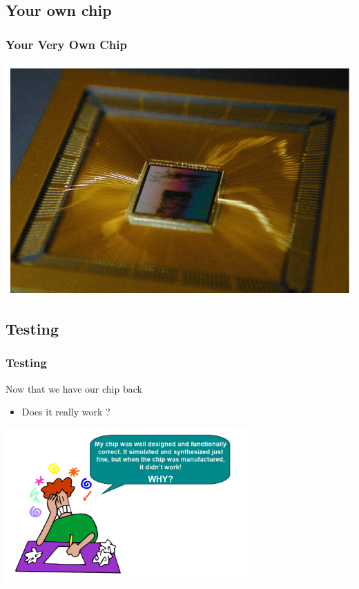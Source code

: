 \documentclass[compress]{beamer}
\begin{document}
\subsection[Chip]{Your own chip}
\begin{frame}
	\frametitle{Your Very Own Chip}
	\begin{center}
		\includegraphics[width=\textwidth]{chip_1}
	\end{center}
\end{frame}
\subsection[Testing]{Testing}
\begin{frame}
\frametitle{Testing}
\begin{block}{Now that we have our chip back}
	\begin{itemize}
		\item Does it really work ?
	\end{itemize}
	
\end{block}
\pause
\begin{center}
	\includegraphics[width=0.7\textwidth]{DFT}
\end{center}
\end{frame}
\end{document}
